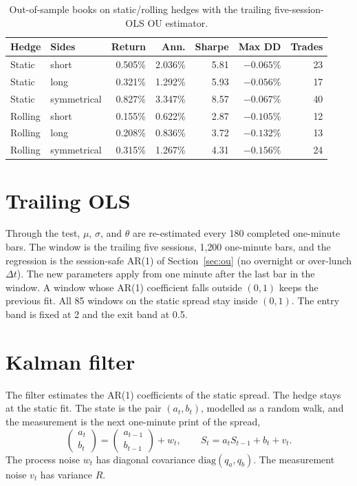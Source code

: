 \documentclass[11pt]{article}
\begin{document}
\begin{table}[ht]
\centering
\caption{Out-of-sample books on static/rolling hedges with the trailing five-session-OLS OU estimator.}
\label{tab:hedge}
\begin{tabular}{llrrrrr}
\toprule
Hedge & Sides & Return & Ann. & Sharpe & Max DD & Trades \\
\midrule
Static & short & 0.505\% & 2.036\% & 5.81 & $-0.065\%$ & 23 \\
Static & long & 0.321\% & 1.292\% & 5.93 & $-0.056\%$ & 17 \\
Static & symmetrical & 0.827\% & 3.347\% & 8.57 & $-0.067\%$ & 40 \\
Rolling & short & 0.155\% & 0.622\% & 2.87 & $-0.105\%$ & 12 \\
Rolling & long & 0.208\% & 0.836\% & 3.72 & $-0.132\%$ & 13 \\
Rolling & symmetrical & 0.315\% & 1.267\% & 4.31 & $-0.156\%$ & 24 \\
\bottomrule
\end{tabular}
\end{table}

\FloatBarrier
\section{Trailing OLS}
\label{sec:trailing}

Through the test, $\mu$, $\sigma$, and $\theta$ are re-estimated every 180 completed one-minute bars. The window is the trailing five sessions, 1{,}200 one-minute bars, and the regression is the session-safe AR(1) of Section~\ref{sec:ou} (no overnight or over-lunch $\Delta t$). The new parameters apply from one minute after the last bar in the window. A window whose AR(1) coefficient falls outside $(0,1)$ keeps the previous fit. All 85 windows on the static spread stay inside $(0,1)$. The entry band is fixed at 2 and the exit band at 0.5.

\section{Kalman filter}

The filter estimates the AR(1) coefficients of the static spread. The hedge stays at the static fit. The state is the pair $(a_t, b_t)$, modelled as a random walk, and the measurement is the next one-minute print of the spread,
\begin{equation}
\begin{pmatrix} a_t \\ b_t \end{pmatrix}
=
\begin{pmatrix} a_{t-1} \\ b_{t-1} \end{pmatrix}
+ w_t,
\qquad
S_t = a_t S_{t-1} + b_t + v_t.
\end{equation}
The process noise $w_t$ has diagonal covariance $\mathrm{diag}(q_a, q_b)$. The measurement noise $v_t$ has variance $R$.
\end{document}
